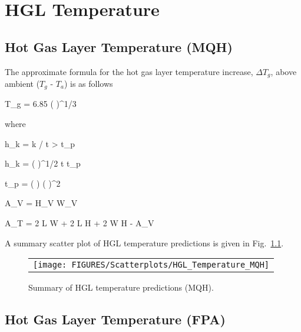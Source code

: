 \chapter{HGL Temperature}
\label{HGL:Chapter}

\section{Hot Gas Layer Temperature (MQH)}

The approximate formula for the hot gas layer temperature increase, $\Delta T_g$, above ambient ($T_g$ - $T_a$) is as follows

\be
\Delta T_g = 6.85 \left(  \right)^{1/3}
\ee

\noindent where

\be
h_k = k / \delta {} t > t_p
\ee

\be
h_k = \left(  \right)^{1/2}  t \le t_p
\ee

\be
t_p = \left(  \right) \left(  \right)^2
\ee

\be
A_V = H_V W_V
\ee

\be
A_T = 2 L W + 2 L H + 2 W H - A_V
\ee

%
%
%
%

\clearpage

A summary scatter plot of HGL temperature predictions is given in Fig.~\ref{hgl_temperature_MQH_summary}. 

\begin{figure}[ht]
\begin{center}
\begin{tabular}{l}
\texttt{[image: FIGURES/Scatterplots/HGL\_Temperature\_MQH]}
\end{tabular}
\end{center}
\caption[Summary of HGL temperature predictions (MQH).]
{Summary of HGL temperature predictions (MQH).}
\label{hgl_temperature_MQH_summary}
\end{figure}


\clearpage


\section{Hot Gas Layer Temperature (FPA)}

